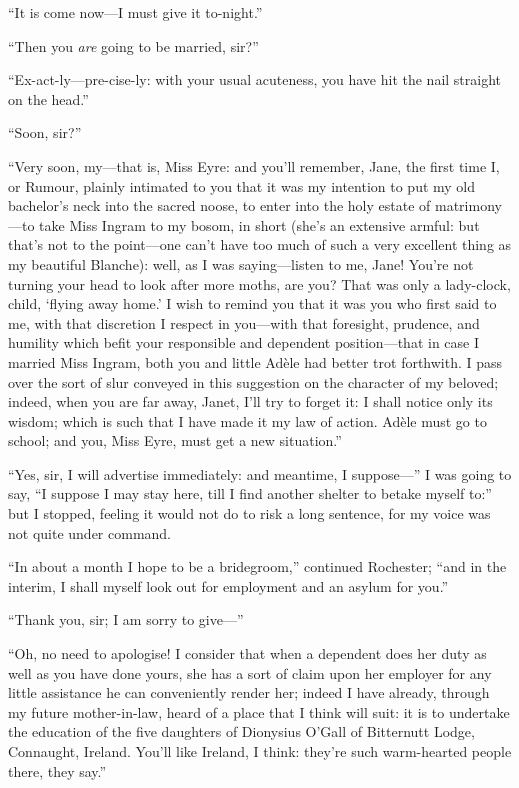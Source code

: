 \enquote{It is come now---I must give it to-night.}

\enquote{Then you \emph{are} going to be married, sir?}

\enquote{Ex-act-ly---pre-cise-ly: with your usual acuteness, you have
hit the nail straight on the head.}

\enquote{Soon, sir?}

\enquote{Very soon, my---that is, Miss Eyre: and you'll remember, Jane,
the first time I, or Rumour, plainly intimated to you that it was my
intention to put my old bachelor's neck into the sacred noose, to enter
into the holy estate of matrimony---to take Miss Ingram to my bosom, in
short (she's an extensive armful: but that's not to the point---one
can't have too much of such a very excellent thing as my beautiful
Blanche): well, as I was saying---listen to me, Jane! You're not
turning your head to look after more moths, are you? That was only a
lady-clock, child, \enquote{flying away home.} I wish to remind you
that it was you who first said to me, with that discretion I respect in
you---with that foresight, prudence, and humility which befit your
responsible and dependent position---that in case I married Miss Ingram,
both you and little Adèle had better trot forthwith. I pass over the
sort of slur conveyed in this suggestion on the character of my beloved;
indeed, when you are far away, Janet, I'll try to forget it: I shall
notice only its wisdom; which is such that I have made it my law of
action. Adèle must go to school; and you, Miss Eyre, must get a new
situation.}

\enquote{Yes, sir, I will advertise immediately: and meantime, I
suppose---} I was going to say, \enquote{I suppose I may stay here, till
I find another shelter to betake myself to:} but I stopped, feeling it
would not do to risk a long sentence, for my voice was not quite under
command.

\enquote{In about a month I hope to be a bridegroom,} continued \Mr{}
 Rochester; \enquote{and in the interim, I shall myself look out for
employment and an asylum for you.}

\enquote{Thank you, sir; I am sorry to give---}

\enquote{Oh, no need to apologise! I consider that when a dependent
does her duty as well as you have done yours, she has a sort of claim
upon her employer for any little assistance he can conveniently render
her; indeed I have already, through my future mother-in-law, heard of a
place that I think will suit: it is to undertake the education of the
five daughters of \Mrs{} Dionysius O'Gall of Bitternutt Lodge, Connaught,
Ireland. You'll like Ireland, I think: they're such warm-hearted people
there, they say.}

